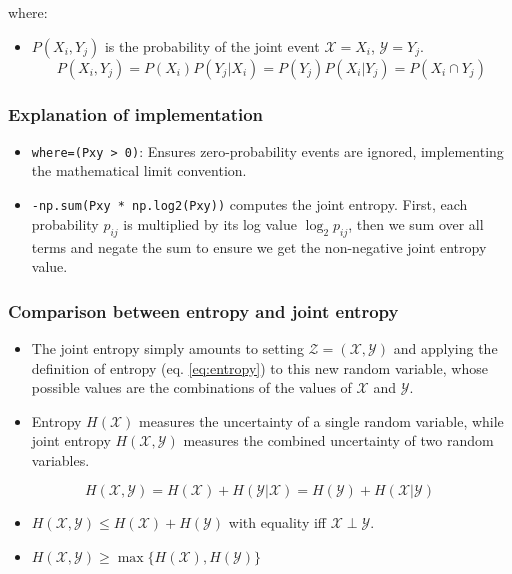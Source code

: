 \documentclass{article}
\begin{document}
where:
\begin{itemize}
    \item $P(X_i, Y_j)$ is the probability of the joint event $\mathcal{X} = X_i$, $\mathcal{Y} = Y_j$. $$P(X_i, Y_j) = P(X_i) P(Y_j|X_i) = P(Y_j) P(X_i|Y_j) = P(X_i \cap Y_j)$$
\end{itemize}

\subsubsection*{Explanation of implementation}

\begin{itemize}
    \item \texttt{where=(Pxy > 0)}: Ensures zero-probability events are ignored, implementing the mathematical limit convention.
    \item \texttt{-np.sum(Pxy * np.log2(Pxy))} computes the joint entropy. First, each probability $p_{ij}$ is multiplied by its log value $\log_2 p_{ij}$, then we sum over all terms and negate the sum to ensure we get the non-negative joint entropy value.
\end{itemize}

\subsubsection*{Comparison between entropy and joint entropy}
\begin{itemize}
    \item The joint entropy simply amounts to setting $\mathcal{Z} = (\mathcal{X}, \mathcal{Y})$ and applying the definition of entropy (eq. \ref{eq:entropy}) to this new random variable, whose possible values are the combinations of the values of $\mathcal{X}$ and $\mathcal{Y}$.
    \item Entropy $H(\mathcal{X})$ measures the uncertainty of a single random variable, while joint entropy $H(\mathcal{X},\mathcal{Y})$ measures the combined uncertainty of two random variables.
\end{itemize}

\begin{equation}
H(\mathcal{X},\mathcal{Y}) = H(\mathcal{X}) + H(\mathcal{Y} | \mathcal{X}) = H(\mathcal{Y}) + H(\mathcal{X} | \mathcal{Y})
\end{equation}

\begin{itemize}
    \item $H(\mathcal{X},\mathcal{Y}) \leq H(\mathcal{X}) + H(\mathcal{Y})$ with equality iff $\mathcal{X} \perp \mathcal{Y}$.
    \item $H(\mathcal{X},\mathcal{Y}) \geq \max \{H(\mathcal{X}), H(\mathcal{Y})\}$
\end{itemize}
\end{document}

